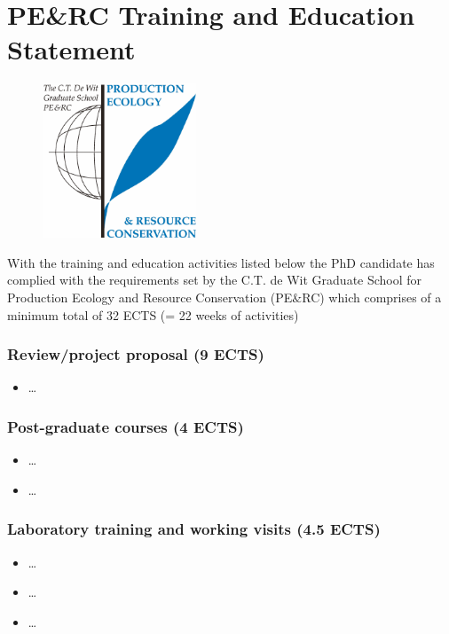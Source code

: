 \chapter{PE\&RC Training and Education Statement}

\begin{figure}
    \centering
    \includegraphics[width=4.6cm,height=4.6cm]{PERC_logo.pdf}
\end{figure}

With the training and education activities listed below the PhD candidate has complied with the requirements set by the C.T. de Wit Graduate School for Production Ecology and Resource Conservation (PE$\&$RC) which comprises of a minimum total of 32 ECTS (= 22 weeks of activities) 

\bigskip

\subsection*{Review/project proposal (9 ECTS)}
\begin{itemize}[nolistsep]
    \item \dots
\end{itemize}

\subsection*{Post-graduate courses (4 ECTS)}
\begin{itemize}[nolistsep]
    \item \dots
    \item \dots
\end{itemize}

\subsection*{Laboratory training and working visits (4.5 ECTS)}
\begin{itemize}[nolistsep]
    \item \dots
    \item \dots
    \item \dots
\end{itemize}

